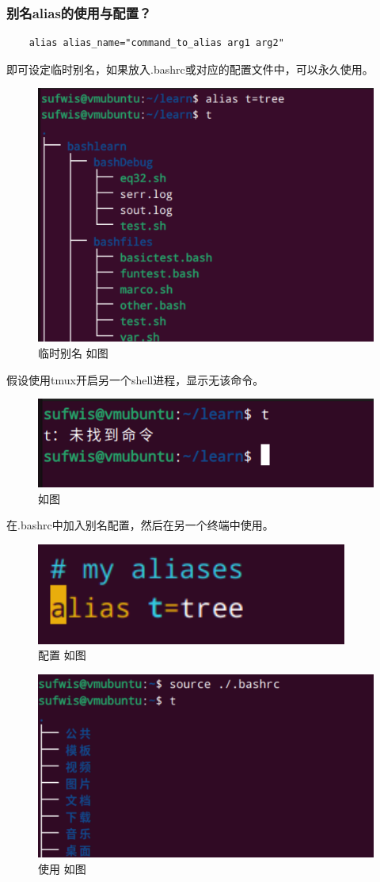 \documentclass[UTF8]{ctexart}
\begin{document}
\subsubsection{别名alias的使用与配置？}
\begin{verbatim}
	alias alias_name="command_to_alias arg1 arg2"
\end{verbatim}
\indent 即可设定临时别名，如果放入.bashrc或对应的配置文件中，可以永久使用。
\begin{figure}[H]
	\centering
	\includegraphics[width=0.7\linewidth]{figure/alias.png}
	\caption{临时别名 如图}
\end{figure}
\indent 假设使用tmux开启另一个shell进程，显示无该命令。
\begin{figure}[H]
	\centering
	\includegraphics[width=0.7\linewidth]{figure/tmux_alias_temp.png}
	\caption{如图}
\end{figure}
\indent 在.bashrc中加入别名配置，然后在另一个终端中使用。
\begin{figure}[H]
	\centering
	\includegraphics[width=0.7\linewidth]{figure/bashrc.png}
	\caption{配置 如图}
\end{figure}
\begin{figure}[H]
	\centering
	\includegraphics[width=0.7\linewidth]{figure/tmux_alias.png}
	\caption{使用 如图}
\end{figure}
\end{document}
